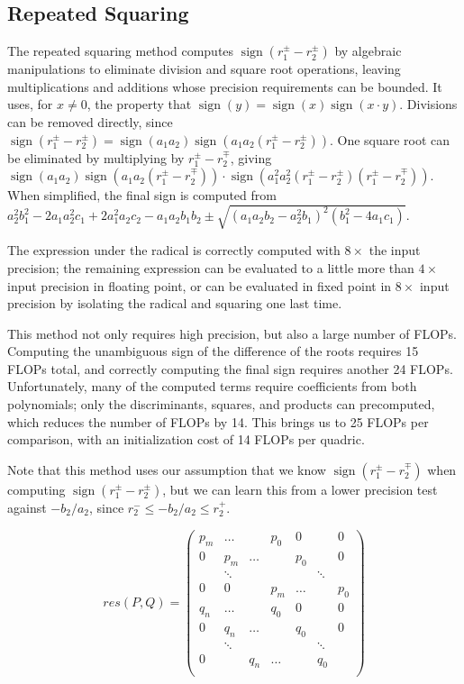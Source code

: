 \documentclass{cccg16}
\DeclareMathOperator{\sign}{sign}
\begin{document}
\subsection{Repeated Squaring}
The repeated squaring method computes $\sign(r_1^\pm-r_2^\pm)$ by
algebraic manipulations to eliminate division and square root
operations, leaving multiplications and additions whose precision
requirements can be bounded.  It uses, for $x\ne 0$, the property that
$\sign(y)=\sign(x)\sign(x\cdot y)$.  Divisions can be removed
directly, since $\sign(r_1^\pm-r_2^\pm)=\sign(a_1 a_2)\sign(a_1 a_2
(r_1^\pm-r_2^\pm))$.  One square root can be eliminated by multiplying
by $r_1^\pm-r_2^\mp$, giving~$\sign(a_1 a_2)\sign(a_1 a_2
(r_1^\pm-r_2^\mp))\cdot\sign(a_1^2 a_2^2 (r_1^\pm - r_2^\pm) (r_1^\pm
- r_2^\mp))$.  When simplified, the final sign is computed
from~$a_2^2b_1^2-2a_1a_2^2c_1+2a_1^2a_2c_2-a_1a_2b_1b_2\pm
\sqrt{(a_1a_2b_2-a_2^2b_1)^2(b_1^2-4a_1c_1)}$.

The expression under the radical is correctly computed with $8\times$
the input precision; the remaining expression can be evaluated to a
little more than $4\times$ input precision in floating point, or can
be evaluated in fixed point in $8\times$ input precision by isolating
the radical and squaring one last time.

This method not only requires high precision, but also a large number
of FLOPs.  Computing the unambiguous sign of the difference of the
roots requires 15 FLOPs total, and correctly computing the final sign
requires another 24 FLOPs.  Unfortunately, many of the computed terms
require coefficients from both polynomials; only the discriminants,
squares, and products can precomputed, which reduces the number of
FLOPs by 14.  This brings us to 25 FLOPs per comparison, with an
initialization cost of 14 FLOPs per quadric.

Note that this method uses our assumption that we know
$\sign(r_1^\pm-r_2^\mp)$ when computing $\sign(r_1^\pm-r_2^\pm)$, but
we can learn this from a lower precision test against $-b_2/a_2$,
since $r_2^- \le -b_2/a_2 \le r_2^+$.

\begin{equation}
  res(P, Q)=\begin{pmatrix}
    p_m & \dots & & p_0 & 0 & & 0\\
    0 & p_m & \dots & & p_0 & & 0\\
    & \ddots & & & & \ddots\\
    0 & 0 & & p_m & \dots & & p_0\\
    q_n & \dots & & q_0 & 0 & & 0\\
    0 & q_n & \dots & & q_0 & & 0\\
    & \ddots & & & & \ddots\\
    0 & & q_n & \dots & & q_0\\
  \end{pmatrix}
  \label{eq:sylv}
\end{equation}
\end{document}

